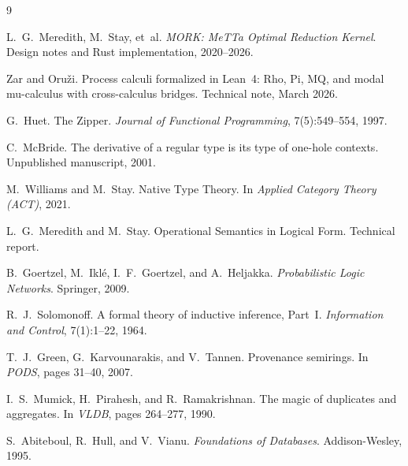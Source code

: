 \documentclass[11pt]{article}
\theoremstyle{definition}
\theoremstyle{remark}
\newcommand{\MeTTa}{\textup{MeTTa}}
\begin{document}
\begin{thebibliography}{9}

L.~G.~Meredith, M.~Stay, et~al.
\newblock \emph{MORK: \MeTTa{} Optimal Reduction Kernel}.
\newblock Design notes and Rust implementation, 2020--2026.

Zar and Oru\v{z}i.
\newblock Process calculi formalized in {Lean}~4: {Rho}, {Pi}, {MQ}, and
  modal mu-calculus with cross-calculus bridges.
\newblock Technical note, March 2026.

G.~Huet.
\newblock The Zipper.
\newblock \emph{Journal of Functional Programming}, 7(5):549--554, 1997.

C.~McBride.
\newblock The derivative of a regular type is its type of one-hole contexts.
\newblock Unpublished manuscript, 2001.

M.~Williams and M.~Stay.
\newblock Native Type Theory.
\newblock In \emph{Applied Category Theory (ACT)}, 2021.

L.~G.~Meredith and M.~Stay.
\newblock Operational Semantics in Logical Form.
\newblock Technical report.

B.~Goertzel, M.~Ikl\'e, I.~F.~Goertzel, and A.~Heljakka.
\newblock \emph{Probabilistic Logic Networks}.
\newblock Springer, 2009.

R.~J.~Solomonoff.
\newblock A formal theory of inductive inference, {Part~I}.
\newblock \emph{Information and Control}, 7(1):1--22, 1964.

T.~J.~Green, G.~Karvounarakis, and V.~Tannen.
\newblock Provenance semirings.
\newblock In \emph{PODS}, pages 31--40, 2007.

I.~S.~Mumick, H.~Pirahesh, and R.~Ramakrishnan.
\newblock The magic of duplicates and aggregates.
\newblock In \emph{VLDB}, pages 264--277, 1990.

S.~Abiteboul, R.~Hull, and V.~Vianu.
\newblock \emph{Foundations of Databases}.
\newblock Addison-Wesley, 1995.

\end{thebibliography}
\end{document}
